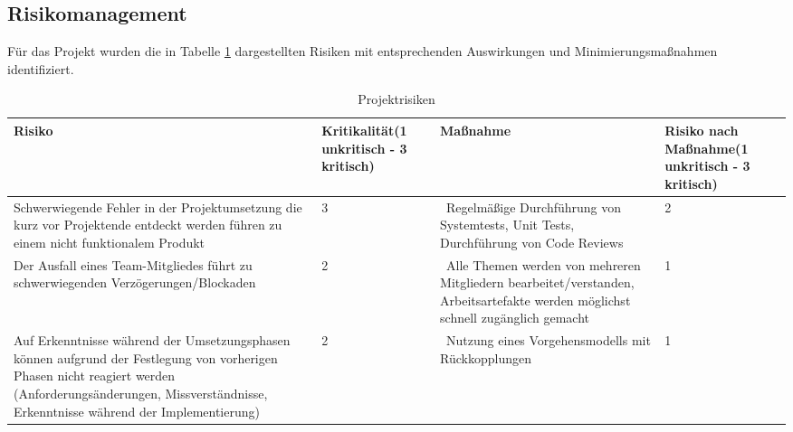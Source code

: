 \subsection{Risikomanagement}
Für das Projekt wurden die in Tabelle \ref{tab:Projektrisiken} dargestellten Risiken mit entsprechenden Auswirkungen und Minimierungsmaßnahmen identifiziert.
\begin{table}[h]
	\begin{tabular}{p{.3\linewidth}|p{.15\linewidth}|p{.3\linewidth}|p{.15\linewidth}}
	Risiko & Kritikalität\linebreak (1 unkritisch - 3 kritisch) & Maßnahme & Risiko nach Maßnahme\linebreak (1 unkritisch - 3 kritisch)\\
	\hline
	Schwerwiegende Fehler in der Projektumsetzung die kurz vor Projektende entdeckt werden führen zu einem nicht funktionalem Produkt & 3 & Regelmäßige Durchführung von Systemtests, Unit Tests, Durchführung von Code Reviews & 2 \\
	\hline
	Der Ausfall eines Team-Mitgliedes führt zu schwerwiegenden Verzögerungen/Blockaden & 2 & Alle Themen werden von mehreren Mitgliedern bearbeitet/verstanden, Arbeitsartefakte werden möglichst schnell zugänglich gemacht & 1 \\
	\hline
	Auf Erkenntnisse während der Umsetzungsphasen können aufgrund der Festlegung von vorherigen Phasen nicht reagiert werden (Anforderungsänderungen, Missverständnisse, Erkenntnisse während der Implementierung)  & 2 & Nutzung eines Vorgehensmodells mit Rückkopplungen & 1 \\
	\hline
	\end{tabular}
	\caption{Projektrisiken}
	\label{tab:Projektrisiken}
\end{table}


